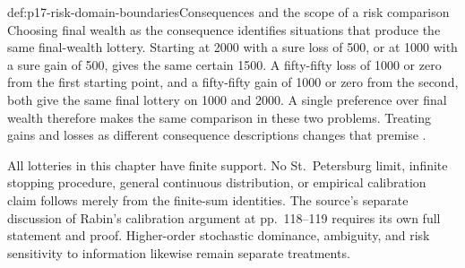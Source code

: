 \begin{hbwarning}{def:p17-risk-domain-boundaries}{Consequences and the scope of a risk comparison}
Choosing final wealth as the consequence identifies situations that
produce the same final-wealth lottery. Starting at 2000 with a sure
loss of 500, or at 1000 with a sure gain of 500, gives the same certain
1500. A fifty-fifty loss of 1000 or zero from the first starting point,
and a fifty-fifty gain of 1000 or zero from the second, both give the
same final lottery on 1000 and 2000. A single preference over final
wealth therefore makes the same comparison in these two problems.
Treating gains and losses as different consequence descriptions changes
that premise \cite[pp.~115--116]{Rubinstein2015LectureNotes}.

All lotteries in this chapter have finite support. No St.~Petersburg
limit, infinite stopping procedure, general continuous distribution,
or empirical calibration claim follows merely from the finite-sum
identities. The source's separate discussion of Rabin's calibration
argument at pp.~118--119 requires its own full statement and proof.
Higher-order stochastic dominance, ambiguity, and risk sensitivity to
information likewise remain separate treatments.
\end{hbwarning}

